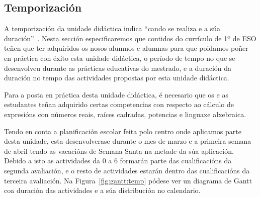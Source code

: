 \subsection{Temporización}
A temporización da unidade didáctica indica ``cando se realiza e a súa duración''~\cite{delvalleud}. Nesta sección especificaremos que contidos do currículo de 1º de ESO teñen que ter adquiridos os nosos alumnos e alumnas para que poidamos poñer en práctica con éxito esta unidade didáctica, o período de tempo no que se desenvolveu durante as prácticas educativas do mestrado, e a duración da duración no tempo das actividades propostas por esta unidade didáctica.

Para a posta en práctica desta unidade didáctica, é necesario que os e as estudantes teñan adquirido certas competencias con respecto ao cálculo de expresións con números reais, raíces cadradas, potencias e linguaxe alxebraica.

Tendo en conta a planificación escolar feita polo centro onde aplicamos parte desta unidade, esta desenvolverase durante o mes de marzo e a primeira semana de abril tendo as vacacións de Semana Santa na metade da súa aplicación. Debido a isto as actividades da 0 a 6 formarán parte das cualificacións da segunda avaliación, e o resto de actividades estarán dentro das cualificacións da terceira avaliación. Na Figura~\ref{fig:gantt:temp} pódese ver un diagrama de Gantt coa duración das actividades e a súa distribución no calendario.

